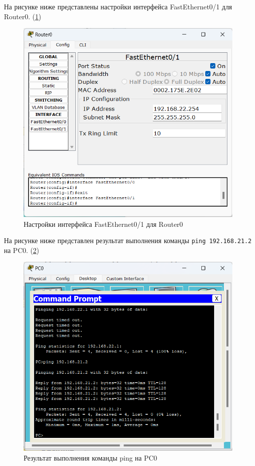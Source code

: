 \documentclass[14pt]{extarticle}
\begin{document}
На рисунке ниже представлены настройки интерфейса FastEthernet0/1 для Router0. (\ref{img:Router0FastEthernet1})

\begin{figure}[H]
    \centering
    \includegraphics[width=1.0\linewidth]{Router0FastEthernet1.png}
    \caption{Настройки интерфейса FastEthernet0/1 для Router0\label{img:Router0FastEthernet1}}
\end{figure}

На рисунке ниже представлен результат выполнения команды \texttt{ping 192.168.21.2} на PC0. (\ref{img:PC0Ping1})

\begin{figure}[H]
    \centering
    \includegraphics[width=1.0\linewidth]{PC0Ping1.png}
    \caption{Результат выполнения команды ping на PC0\label{img:PC0Ping1}}
\end{figure}
\end{document}
